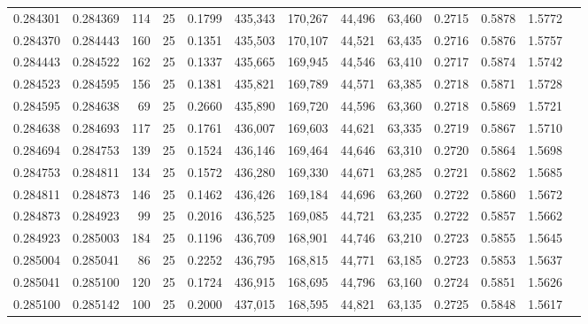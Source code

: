 \begin{tabular}{rrrrrrrrrrrrr}
0.284301 & 0.284369 &   114 &  25 &                                     0.1799 & 435,343 & 170,267 &  44,496 &  63,460 & 0.2715 & 0.5878 & 1.5772 \\
0.284370 & 0.284443 &   160 &  25 &                                     0.1351 & 435,503 & 170,107 &  44,521 &  63,435 & 0.2716 & 0.5876 & 1.5757 \\
0.284443 & 0.284522 &   162 &  25 &                                     0.1337 & 435,665 & 169,945 &  44,546 &  63,410 & 0.2717 & 0.5874 & 1.5742 \\
0.284523 & 0.284595 &   156 &  25 &                                     0.1381 & 435,821 & 169,789 &  44,571 &  63,385 & 0.2718 & 0.5871 & 1.5728 \\
0.284595 & 0.284638 &    69 &  25 &                                     0.2660 & 435,890 & 169,720 &  44,596 &  63,360 & 0.2718 & 0.5869 & 1.5721 \\
0.284638 & 0.284693 &   117 &  25 &                                     0.1761 & 436,007 & 169,603 &  44,621 &  63,335 & 0.2719 & 0.5867 & 1.5710 \\
0.284694 & 0.284753 &   139 &  25 &                                     0.1524 & 436,146 & 169,464 &  44,646 &  63,310 & 0.2720 & 0.5864 & 1.5698 \\
0.284753 & 0.284811 &   134 &  25 &                                     0.1572 & 436,280 & 169,330 &  44,671 &  63,285 & 0.2721 & 0.5862 & 1.5685 \\
0.284811 & 0.284873 &   146 &  25 &                                     0.1462 & 436,426 & 169,184 &  44,696 &  63,260 & 0.2722 & 0.5860 & 1.5672 \\
0.284873 & 0.284923 &    99 &  25 &                                     0.2016 & 436,525 & 169,085 &  44,721 &  63,235 & 0.2722 & 0.5857 & 1.5662 \\
0.284923 & 0.285003 &   184 &  25 &                                     0.1196 & 436,709 & 168,901 &  44,746 &  63,210 & 0.2723 & 0.5855 & 1.5645 \\
0.285004 & 0.285041 &    86 &  25 &                                     0.2252 & 436,795 & 168,815 &  44,771 &  63,185 & 0.2723 & 0.5853 & 1.5637 \\
0.285041 & 0.285100 &   120 &  25 &                                     0.1724 & 436,915 & 168,695 &  44,796 &  63,160 & 0.2724 & 0.5851 & 1.5626 \\
0.285100 & 0.285142 &   100 &  25 &                                     0.2000 & 437,015 & 168,595 &  44,821 &  63,135 & 0.2725 & 0.5848 & 1.5617 \\

\end{tabular}
